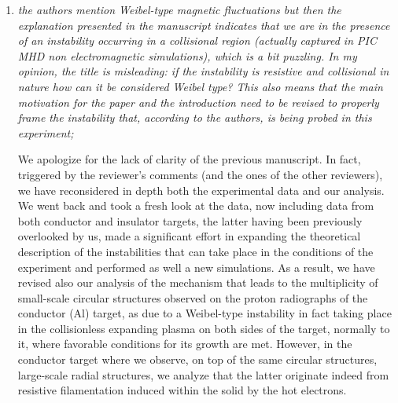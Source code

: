 \documentclass{article}
\begin{document}
\begin{enumerate}
\item  \textit{the authors mention Weibel-type magnetic fluctuations but then the explanation presented in the manuscript indicates that we are in the presence of an instability occurring in a collisional region (actually captured in PIC MHD non electromagnetic simulations), which is a bit puzzling. In my opinion, the title is misleading: if the instability is resistive and collisional in nature how can it be considered Weibel type? This also means that the main motivation for the paper and the introduction need to be revised to properly frame the instability that, according to the authors, is being probed in this experiment; }

We apologize for the lack of clarity of the  previous manuscript.
In fact, triggered by the reviewer’s comments (and the ones of the other reviewers), we have reconsidered in depth both the experimental data and our analysis. We went back and took a fresh look at the data, now including data from both conductor and insulator targets, the latter having been previously overlooked by us, made a significant effort in expanding the theoretical description of the instabilities that can take place in the conditions of the experiment and performed as well a new simulations. 
As a result, we have revised also our analysis of the mechanism that leads to the multiplicity of small-scale circular structures observed on the proton radiographs of the conductor (Al) target, as due to a Weibel-type instability in fact taking place in the collisionless expanding plasma on both sides of the target, normally to it, where favorable conditions for its growth are met.
However, in the conductor target where we observe, on top of the same circular structures, large-scale radial structures, we analyze that the latter originate indeed from resistive filamentation induced within the solid by the hot electrons.


\end{enumerate}
\end{document}
